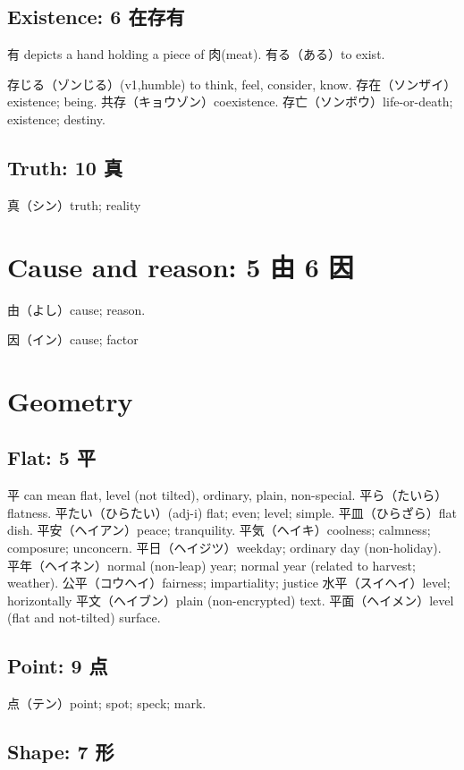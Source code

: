 \subsection{Existence: 6 在存有}

有 depicts a hand holding a piece of 肉(meat).
有る（ある）to exist.

存じる（ゾンじる）(v1,humble) to think, feel, consider, know.
存在（ソンザイ）existence; being.
共存（キョウゾン）coexistence.
存亡（ソンボウ）life-or-death; existence; destiny.

\subsection{Truth: 10 真}

真（シン）truth; reality

\section{Cause and reason: 5 由 6 因}

由（よし）cause; reason.

因（イン）cause; factor

\section{Geometry}

\subsection{Flat: 5 平}

平 can mean flat, level (not tilted), ordinary, plain, non-special.
平ら（たいら）flatness.
平たい（ひらたい）(adj-i) flat; even; level; simple.
平皿（ひらざら）flat dish.
平安（ヘイアン）peace; tranquility.
平気（ヘイキ）coolness; calmness; composure; unconcern.
平日（ヘイジツ）weekday; ordinary day (non-holiday).
平年（ヘイネン）normal (non-leap) year; normal year (related to harvest; weather).
公平（コウヘイ）fairness; impartiality; justice
水平（スイヘイ）level; horizontally
平文（ヘイブン）plain (non-encrypted) text.
平面（ヘイメン）level (flat and not-tilted) surface.

\subsection{Point: 9 点}

点（テン）point; spot; speck; mark.

\subsection{Shape: 7 形}

